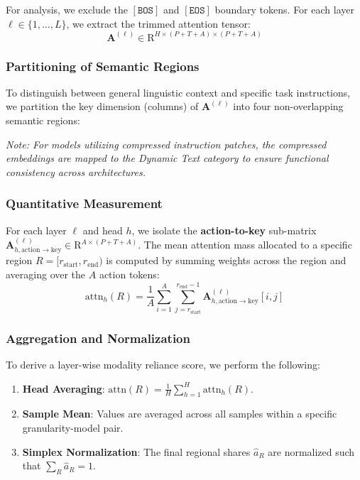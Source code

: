 For analysis, we exclude the $[\texttt{BOS}]$ and $[\texttt{EOS}]$ boundary tokens. For each layer $\ell \in \{1, \dots, L\}$, we extract the trimmed attention tensor:
\begin{equation}
    \mathbf{A}^{(\ell)} \in \mathrm{R}^{H \times (P+T+A) \times (P+T+A)}
\end{equation}

\subsubsection{Partitioning of Semantic Regions}
To distinguish between general linguistic context and specific task instructions, we partition the key dimension (columns) of $\mathbf{A}^{(\ell)}$ into four non-overlapping semantic regions:

\textit{Note: For models utilizing compressed instruction patches, the compressed embeddings are mapped to the Dynamic Text category to ensure functional consistency across architectures.}

\subsubsection{Quantitative Measurement}
For each layer $\ell$ and head $h$, we isolate the \textbf{action-to-key} sub-matrix $\mathbf{A}^{(\ell)}_{h,\text{action} \to \text{key}} \in \mathrm{R}^{A \times (P+T+A)}$. The mean attention mass allocated to a specific region $R = [r_{\text{start}}, r_{\text{end}})$ is computed by summing weights across the region and averaging over the $A$ action tokens:
\begin{equation}
    \text{attn}_h(R) = \frac{1}{A} \sum_{i=1}^{A} \sum_{j=r_{\text{start}}}^{r_{\text{end}}-1} \mathbf{A}^{(\ell)}_{h,\text{action} \to \text{key}}[i, j]
\end{equation}

\subsubsection{Aggregation and Normalization}
To derive a layer-wise modality reliance score, we perform the following:
\begin{enumerate}
    \item \textbf{Head Averaging}: $\text{attn}(R) = \frac{1}{H} \sum_{h=1}^{H} \text{attn}_h(R)$.
    \item \textbf{Sample Mean}: Values are averaged across all samples within a specific granularity-model pair.
    \item \textbf{Simplex Normalization}: The final regional shares $\hat{a}_R$ are normalized such that $\sum_{R} \hat{a}_R = 1$.
\end{enumerate}


